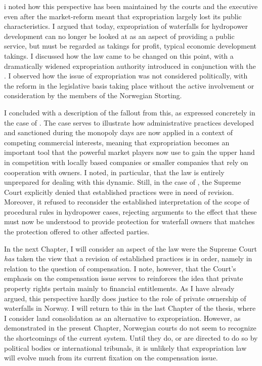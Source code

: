 i noted how this perspective has been maintained by the courts and the executive even after the market-reform meant that expropriation largely lost its public characteristics. I argued that today, expropriation of waterfalls for hydropower development can no longer be looked at as an aspect of providing a public service, but must be regarded as takings for profit, typical economic development takings. I discussed how the law came to be changed on this point, with a dramatically widened expropriation authority introduced in conjunction with the \cite{wra00}. I observed how the issue of expropriation was not considered politically, with the reform in the legislative basis taking place without the active involvement or consideration by the members of the Norwegian Storting.

I concluded with a description of the fallout from this, as expressed concretely in the case of \cite{måland11}. The case serves to illustrate how administrative practices developed and sanctioned during the monopoly days are now applied in a context of competing commercial interests, meaning that expropriation becomes an important tool that the powerful market players now use to gain the upper hand in competition with locally based companies or smaller companies that rely on cooperation with owners. I noted, in particular, that the law is entirely unprepared for dealing with this dynamic. Still, in the case of \cite{måland11}, the Supreme Court explicitly denied that established practices were in need of revision. Moreover, it refused to reconsider the established interpretation of the scope of procedural rules in hydropower cases, rejecting arguments to the effect that these must now be understood to provide protection for waterfall owners that matches the protection offered to other affected parties.

In the next Chapter, I will consider an aspect of the law were the Supreme Court {\it has} taken the view that a revision of established practices is in order, namely in relation to the question of compensation. I note, however, that the Court's emphasis on the compensation issue serves to reinforces the idea that private property rights pertain mainly to financial entitlements. As I have already argued, this perspective hardly does justice to the role of private ownership of waterfalls in Norway. I will return to this in the last Chapter of the thesis, where I consider land consolidation as an alternative to expropriation. However, as demonstrated in the present Chapter, Norwegian courts do not seem to recognize the shortcomings of the current system. Until they do, or are directed to do so by political bodies or international tribunals, it is unlikely that expropriation law will evolve much from its current fixation on the compensation issue. 

